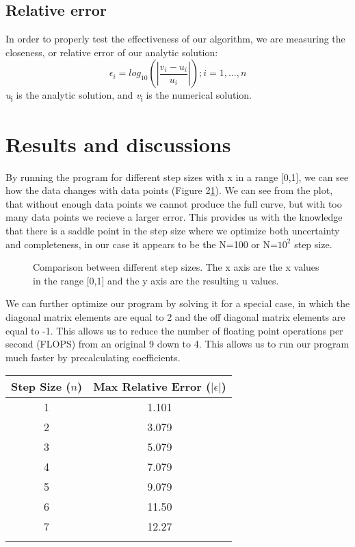 \documentclass[10pt,showpacs,preprintnumbers,footinbib,amsmath,amssymb,aps,prl,twocolumn,groupedaddress,superscriptaddress,showkeys]{revtex4-1}
\begin{document}
	\subsection{Relative error}
In order to properly test the effectiveness of our algorithm, we are measuring the closeness, or relative error of our analytic solution:
	\begin{equation}
	\epsilon_{i} = log_{10}(|\frac{v_{i}-u_{i}}{u_{i}}|)  ; i = 1,...,n
	\label{error}
	\end{equation}
{\it u}\textsubscript{i} is the analytic solution, and {\it v}\textsubscript{i} is the numerical solution.

\section{Results and discussions}

  By running the program for different step sizes with x in a range [0,1], we can see how the data changes with data points (Figure 2\ref{uvx}).    We can see from the plot, that without enough data points we cannot produce the full curve, but with too many data points we recieve a larger error.  This provides us with the knowledge that there is a saddle point in the step size where we optimize both uncertainty and completeness, in our case it appears to be the N=100 or N=$10^{2}$ step size.

\begin{figure}[!ht]
	\centering
	\label{uvx}
	\caption{Comparison between different step sizes.  The x axis are the x values in the range [0,1] and the y axis are the resulting u values.}
\end{figure}

We can further optimize our program by solving it for a special case, in which the diagonal matrix elements are equal to 2 and the off diagonal matrix elements are equal to -1.  This allows us to reduce the number of floating point operations per second (FLOPS) from an original 9 down to 4.  This allows us to run our program much faster by precalculating coefficients.




\begin{center}
	\begin{tabular}{cc}
		\hline \hline
			Step Size ($n$) &  Max Relative Error ($|\epsilon|$)\\
			\hline
			1 & 1.101\\
			2 & 3.079\\
			3 & 5.079\\
			4 & 7.079\\
			5 & 9.079\\
			6 & 11.50\\
			7 & 12.27\\
			\hline
			\label{errortable}
	\end{tabular}
\end{center}
	
\end{document}
